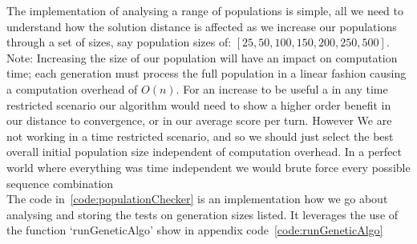 The implementation of analysing a range of populations is simple, all we need to understand how the solution distance is affected as we increase our populations through a set of sizes, say population sizes of: \([25,50,100,150,200,250,500]\).\\

Note: Increasing the size of our population will have an impact on computation time; each generation must process the full population in a linear fashion causing a computation overhead of \(O(n)\). 
For an increase to be useful a in any time restricted scenario our algorithm would need to show a higher order benefit in our distance to convergence, or in our average score per turn.
However We are not working in a time restricted scenario, and so we should just select the best overall initial population size independent of computation overhead.
In a perfect world where everything was time independent we would brute force every possible sequence combination\\

The code in~\ref{code:populationChecker} is an implementation how we go about analysing and storing the tests on generation sizes listed. It leverages the use of the function `runGeneticAlgo' show in appendix code~\ref{code:runGeneticAlgo} \\

